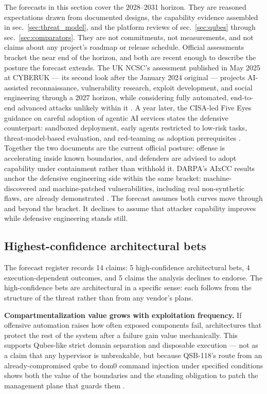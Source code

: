 \documentclass[
  english,
  9pt,
]{extarticle}
\begin{document}
The forecasts in this section cover the 2028--2031 horizon. They are
reasoned expectations drawn from documented designs, the capability
evidence assembled in sec.~\ref{sec:threat_model}, and the platform
reviews of sec.~\ref{sec:qubes} through sec.~\ref{sec:comparators}. They
are not commitments, not measurements, and not claims about any
project's roadmap or release schedule. Official assessments bracket the
near end of the horizon, and both are recent enough to describe the
posture the forecast extends. The UK NCSC's assessment published in May
2025 at CYBERUK --- its second look after the January 2024 original
\citep{ncsc_ai_threat_2024} --- projects AI-assisted reconnaissance,
vulnerability research, exploit development, and social engineering
through a 2027 horizon, while considering fully automated, end-to-end
advanced attacks unlikely within it \citep{ncsc_ai_cyber_threat}. A year
later, the CISA-led Five Eyes guidance on careful adoption of agentic AI
services states the defensive counterpart: sandboxed deployment, early
agents restricted to low-risk tasks, threat-model-based evaluation, and
red-teaming as adoption prerequisites \citep{cisa_agentic_guidance}.
Together the two documents are the current official posture: offense is
accelerating inside known boundaries, and defenders are advised to adopt
capability under containment rather than withhold it. DARPA's AIxCC
results anchor the defensive engineering side within the same bracket:
machine-discovered and machine-patched vulnerabilities, including real
non-synthetic flaws, are already demonstrated
\citep{darpa_aixcc_results}. The forecast assumes both curves move
through and beyond the bracket. It declines to assume that attacker
capability improves while defensive engineering stands still.

\subsection{Highest-confidence architectural
bets}\label{highest-confidence-architectural-bets}

The forecast register records 14 claims: 5 high-confidence architectural
bets, 4 execution-dependent outcomes, and 5 claims the analysis declines
to endorse. The high-confidence bets are architectural in a specific
sense: each follows from the structure of the threat rather than from
any vendor's plans.

\textbf{Compartmentalization value grows with exploitation frequency.}
If offensive automation raises how often exposed components fail,
architectures that protect the rest of the system after a failure gain
value mechanically. This supports Qubes-like strict domain separation
and disposable execution --- not as a claim that any hypervisor is
unbreakable, but because QSB-118's route from an already-compromised
qube to dom0 command injection under specified conditions shows both the
value of the boundaries and the standing obligation to patch the
management plane that guards them \citep{qsb_118}.
\end{document}
